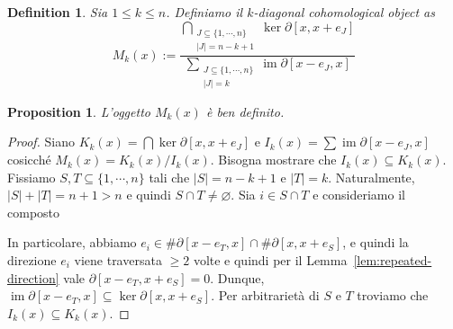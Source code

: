 \documentclass[a4paper]{article}
\DeclareMathOperator{\im}{im}
\newtheorem{proposition}[theorem]{Proposition}
\newtheorem{definition}{Definition}[section]
\begin{document}
\begin{definition}
    Sia \(1 \leq k \leq n\). Definiamo il \emph{\(k\)-diagonal cohomological object} as
    \[
        M_k(x) := \frac{
            \displaystyle
            \bigcap_{
                \substack{
                    J \subseteq \{1, \cdots, n\} \\
                    |J| = n-k+1
                }
            } \ker\partial\left[
                x, x + e_J
            \right]
        }{
            \displaystyle
            \sum_{
                \substack{
                    J \subseteq \{1, \cdots, n\} \\
                    |J| = k
                }
            } \im\partial\left[
                x - e_J, x
            \right]
        }
    \]
\end{definition}

\begin{proposition}
    L'oggetto \(M_k(x)\) è ben definito.
\end{proposition}

\begin{proof}
    Siano \(K_k(x) = \bigcap \ker \partial[x,x+e_J]\) e
    \(I_k(x) = \sum \im \partial[x-e_J, x]\) cosicché \(M_k(x) = K_k(x)/I_k(x)\).
    Bisogna mostrare che \(I_k(x) \subseteq K_k(x)\).
    Fissiamo \(S,T \subseteq \{1, \cdots, n\}\) tali che
    \(|S| = n-k+1\) e \(|T| = k\).
    Naturalmente, \(|S| + |T| = n+1 > n\) e quindi \(S \cap T \neq \varnothing\).
    Sia \(i \in S \cap T\) e consideriamo il composto
    \begin{center}
    \end{center}
    In particolare, abbiamo \(e_i \in \#\partial[x-e_T,x] \cap \#\partial[x,x+e_S]\),
    e quindi la direzione \(e_i\) viene traversata \(\geq 2\) volte e quindi per il Lemma~\ref{lem:repeated-direction}
    vale \(\partial[x-e_T, x+e_S] = 0\).
    Dunque, \(\im \partial[x-e_T, x] \subseteq \ker \partial[x, x+e_S]\).
    Per arbitrarietà di \(S\) e \(T\) troviamo che \(I_k(x) \subseteq K_k(x)\).
\end{proof}
\end{document}
